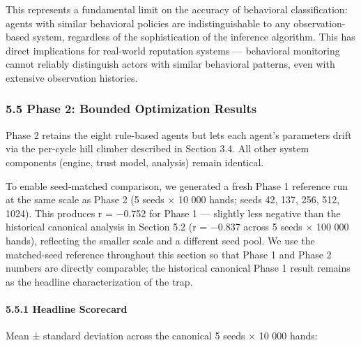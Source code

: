 \documentclass[
]{article}
\begin{document}
This represents a fundamental limit on the accuracy of behavioral
classification: agents with similar behavioral policies are
indistinguishable to any observation-based system, regardless of the
sophistication of the inference algorithm. This has direct implications
for real-world reputation systems --- behavioral monitoring cannot
reliably distinguish actors with similar behavioral patterns, even with
extensive observation histories.

\hypertarget{phase-2-bounded-optimization-results}{%
\subsubsection{5.5 Phase 2: Bounded Optimization
Results}\label{phase-2-bounded-optimization-results}}

Phase 2 retains the eight rule-based agents but lets each agent's
parameters drift via the per-cycle hill climber described in Section
3.4. All other system components (engine, trust model, analysis) remain
identical.

To enable seed-matched comparison, we generated a fresh Phase 1
reference run at the same scale as Phase 2 (5 seeds × 10 000 hands;
seeds 42, 137, 256, 512, 1024). This produces r = −0.752 for Phase 1 ---
slightly less negative than the historical canonical analysis in Section
5.2 (r = −0.837 across 5 seeds × 100 000 hands), reflecting the smaller
scale and a different seed pool. We use the matched-seed reference
throughout this section so that Phase 1 and Phase 2 numbers are directly
comparable; the historical canonical Phase 1 result remains as the
headline characterization of the trap.

\hypertarget{headline-scorecard}{%
\paragraph{5.5.1 Headline Scorecard}\label{headline-scorecard}}

Mean ± standard deviation across the canonical 5 seeds × 10 000 hands:
\end{document}
